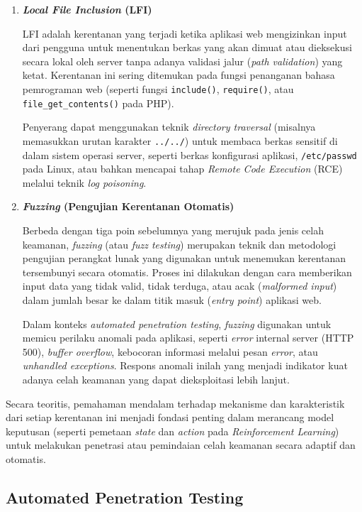 \begin{enumerate}
    \item \textbf{\textit{Local File Inclusion} (LFI)}
    
    LFI adalah kerentanan yang terjadi ketika aplikasi web mengizinkan input dari pengguna untuk menentukan berkas yang akan dimuat atau dieksekusi secara lokal oleh server tanpa adanya validasi jalur (\textit{path validation}) yang ketat. Kerentanan ini sering ditemukan pada fungsi penanganan bahasa pemrograman web (seperti fungsi \texttt{include()}, \texttt{require()}, atau \texttt{file\_get\_contents()} pada PHP).
    
    Penyerang dapat menggunakan teknik \textit{directory traversal} (misalnya memasukkan urutan karakter \texttt{../../}) untuk membaca berkas sensitif di dalam sistem operasi server, seperti berkas konfigurasi aplikasi, \texttt{/etc/passwd} pada Linux, atau bahkan mencapai tahap \textit{Remote Code Execution} (RCE) melalui teknik \textit{log poisoning}.

    \item \textbf{\textit{Fuzzing} (Pengujian Kerentanan Otomatis)}
    
    Berbeda dengan tiga poin sebelumnya yang merujuk pada jenis celah keamanan, \textit{fuzzing} (atau \textit{fuzz testing}) merupakan teknik dan metodologi pengujian perangkat lunak yang digunakan untuk menemukan kerentanan tersembunyi secara otomatis. Proses ini dilakukan dengan cara memberikan input data yang tidak valid, tidak terduga, atau acak (\textit{malformed input}) dalam jumlah besar ke dalam titik masuk (\textit{entry point}) aplikasi web.
    
    Dalam konteks \textit{automated penetration testing}, \textit{fuzzing} digunakan untuk memicu perilaku anomali pada aplikasi, seperti \textit{error} internal server (HTTP 500), \textit{buffer overflow}, kebocoran informasi melalui pesan \textit{error}, atau \textit{unhandled exceptions}. Respons anomali inilah yang menjadi indikator kuat adanya celah keamanan yang dapat dieksploitasi lebih lanjut.
\end{enumerate}

Secara teoritis, pemahaman mendalam terhadap mekanisme dan karakteristik dari setiap kerentanan ini menjadi fondasi penting dalam merancang model keputusan (seperti pemetaan \textit{state} dan \textit{action} pada \textit{Reinforcement Learning}) untuk melakukan penetrasi atau pemindaian celah keamanan secara adaptif dan otomatis.

\subsection{Automated Penetration Testing}

